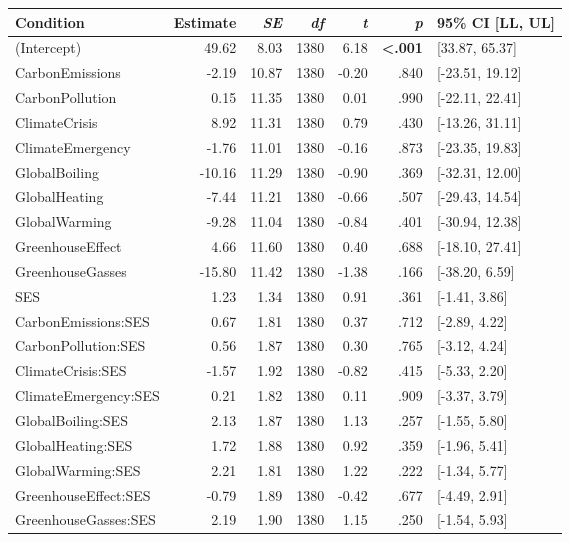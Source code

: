 \begin{table}[ht]
\centering
\begin{tabular}{lrrrrrl}
  \hline
Condition & Estimate & \textit{SE} & \textit{df} & \textit{t} & \textit{p} & 95\% CI [LL, UL] \\ 
  \hline
(Intercept) & 49.62 & 8.03 & 1380 & 6.18 & \textbf{\textless  .001} & [33.87, 65.37] \\ 
  CarbonEmissions & -2.19 & 10.87 & 1380 & -0.20 & .840 & [-23.51, 19.12] \\ 
  CarbonPollution & 0.15 & 11.35 & 1380 & 0.01 & .990 & [-22.11, 22.41] \\ 
  ClimateCrisis & 8.92 & 11.31 & 1380 & 0.79 & .430 & [-13.26, 31.11] \\ 
  ClimateEmergency & -1.76 & 11.01 & 1380 & -0.16 & .873 & [-23.35, 19.83] \\ 
  GlobalBoiling & -10.16 & 11.29 & 1380 & -0.90 & .369 & [-32.31, 12.00] \\ 
  GlobalHeating & -7.44 & 11.21 & 1380 & -0.66 & .507 & [-29.43, 14.54] \\ 
  GlobalWarming & -9.28 & 11.04 & 1380 & -0.84 & .401 & [-30.94, 12.38] \\ 
  GreenhouseEffect & 4.66 & 11.60 & 1380 & 0.40 & .688 & [-18.10, 27.41] \\ 
  GreenhouseGasses & -15.80 & 11.42 & 1380 & -1.38 & .166 & [-38.20, 6.59] \\ 
  SES & 1.23 & 1.34 & 1380 & 0.91 & .361 & [-1.41, 3.86] \\ 
  CarbonEmissions:SES & 0.67 & 1.81 & 1380 & 0.37 & .712 & [-2.89, 4.22] \\ 
  CarbonPollution:SES & 0.56 & 1.87 & 1380 & 0.30 & .765 & [-3.12, 4.24] \\ 
  ClimateCrisis:SES & -1.57 & 1.92 & 1380 & -0.82 & .415 & [-5.33, 2.20] \\ 
  ClimateEmergency:SES & 0.21 & 1.82 & 1380 & 0.11 & .909 & [-3.37, 3.79] \\ 
  GlobalBoiling:SES & 2.13 & 1.87 & 1380 & 1.13 & .257 & [-1.55, 5.80] \\ 
  GlobalHeating:SES & 1.72 & 1.88 & 1380 & 0.92 & .359 & [-1.96, 5.41] \\ 
  GlobalWarming:SES & 2.21 & 1.81 & 1380 & 1.22 & .222 & [-1.34, 5.77] \\ 
  GreenhouseEffect:SES & -0.79 & 1.89 & 1380 & -0.42 & .677 & [-4.49, 2.91] \\ 
  GreenhouseGasses:SES & 2.19 & 1.90 & 1380 & 1.15 & .250 & [-1.54, 5.93] \\ 
   \hline
\end{tabular}
\end{table}

